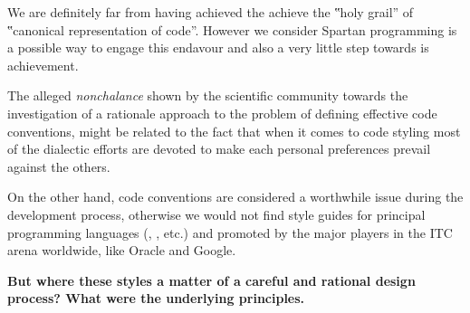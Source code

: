 We are definitely far from having achieved the achieve the ‟holy grail” of
‟canonical representation of code”.
However we consider Spartan programming is a possible way to engage this endavour and
also a very little step towards is achievement.

The alleged \emph{nonchalance} shown by the scientific community towards the
investigation of a rationale approach to the problem of defining effective code
conventions, might be related to the fact that when it comes to code styling
most of the dialectic efforts are devoted to make each personal preferences
prevail against the others.

On the other hand, code conventions are considered a worthwhile issue during
the development process, otherwise we would not find style guides for principal
programming languages (\Java, \CC, etc.) and promoted by the major players in
the ITC arena worldwide, like
Oracle
and Google.

\textbf{But where these styles a matter of a careful and rational design
  process?
What were the underlying principles.}



